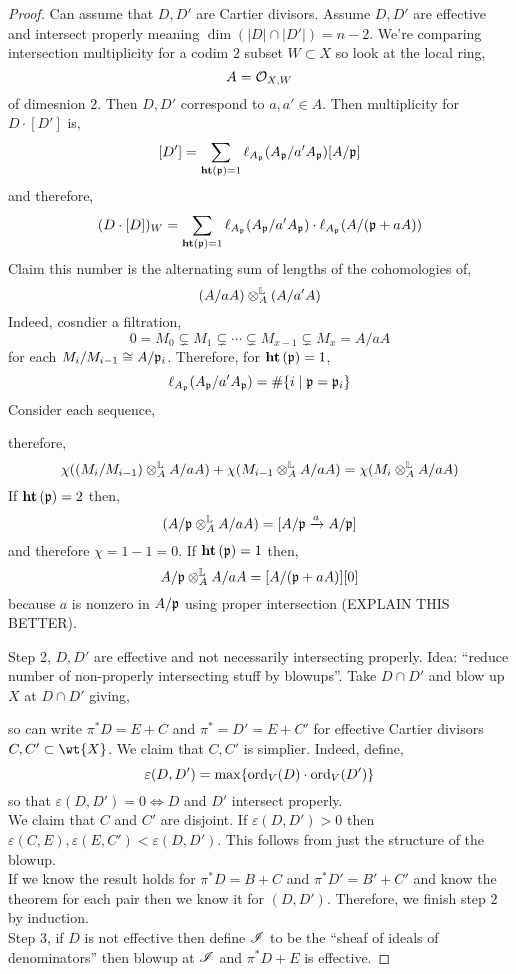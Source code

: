 \documentclass[12pt]{article}
\begin{document}
\begin{proof}
Can assume that $D, D'$ are Cartier divisors. Assume $D, D'$ are effective and intersect properly meaning $\dim{(|D| \cap |D'|)} = n-2$. We're comparing intersection multiplicity for a codim $2$ subset $W \subset X$ so look at the local ring,
\[ A = \mathcal{O}_{X, W} \]
of dimesnion $2$. Then $D, D'$ correspond to $a,a' \in A$. Then multiplicity for $D \cdot [D']$ is,
\[ [D'] = \sum_{\mathbf{ht}\left( \mathfrak{p} \right) = 1} \ell_{A_{\mathfrak{p}}}(A_{\mathfrak{p}} / a' A_{\mathfrak{p}}) [A/\mathfrak{p}] \]
and therefore,
\[ (D \cdot [D])_W = \sum_{\mathbf{ht}\left( \mathfrak{p} \right) = 1} \ell_{A_{\mathfrak{p}}}(A_{\mathfrak{p}} / a' A_{\mathfrak{p}}) \cdot \ell_{A_{\mathfrak{p}}}(A / (\mathfrak{p} + a A)) \]
Claim this number is the alternating sum of lengths of the cohomologies of,
\[ (A / a A) \otimes^{\mathbb{L}}_A (A / a' A) \]
Indeed, cosndier a filtration,
\[ 0 = M_0 \subsetneq M_1 \subsetneq \cdots \subsetneq M_{x-1} \subsetneq M_x = A / a A \]
for each $M_i / M_{i-1} \cong A / \mathfrak{p}_i$. Therefore, for $\mathbf{ht}\left( \mathfrak{p} \right) = 1$,
\[ \ell_{A_{\mathfrak{p}}}(A_{\mathfrak{p}} / a' A_{\mathfrak{p}}) = \# \{ i \mid \mathfrak{p} = \mathfrak{p}_i \} \]
Consider each sequence,
\begin{center}
\end{center}
therefore,
\[ \chi((M_i / M_{i-1}) \otimes_A^{\mathbb{L}} A / a A) + \chi(M_{i-1} \otimes_A^{\mathbb{L}} A / a A) = \chi(M_i \otimes_A^{\mathbb{L}} A / a A) \]
If $\mathbf{ht}\left( \mathfrak{p} \right) = 2$ then,
\[ (A / \mathfrak{p} \otimes_A^{\mathbb{L}} A / a A) = [ A / \mathfrak{p} \xrightarrow{a} A / \mathfrak{p}] \]
and therefore $\chi = 1 - 1 = 0$. If $\mathbf{ht}\left( \mathfrak{p} \right) = 1$ then,
\[ A / \mathfrak{p} \otimes^{\mathbb{L}}_A A / a A = [A / (\mathfrak{p} + a A)][0] \] 
because $a$ is nonzero in $A / \mathfrak{p}$ using proper intersection (EXPLAIN THIS BETTER). 

Step 2, $D, D'$ are effective and not necessarily intersecting properly. Idea: ``reduce number of non-properly intersecting stuff by blowups''. Take $D \cap D'$ and blow up $X$ at $D \cap D'$ giving,
\begin{center}
\end{center}
so can write $\pi^* D = E + C$ and $\pi^* = D' = E + C'$ for effective Cartier divisors $C, C' \subset \wt{X}$. We claim that $C, C'$ is simplier. Indeed, define,
\[ \varepsilon(D, D') = \max \{ \operatorname{\mathrm{ord}}_V(D) \cdot \operatorname{\mathrm{ord}}_V(D') \} \]
so that $\varepsilon(D, D') = 0 \iff D$ and $D'$ intersect properly.
\bigskip\\
We claim that $C$ and $C'$ are disjoint. If $\varepsilon(D, D') > 0$ then $\varepsilon(C, E), \varepsilon(E, C') < \varepsilon(D, D')$. This follows from just the structure of the blowup. 
\bigskip\\
If we know the result holds for $\pi^* D = B + C$ and $\pi^* D' = B' + C'$ and know the theorem for each pair then we know it for $(D, D')$. Therefore, we finish step $2$ by induction. 
\bigskip\\
Step 3, if $D$ is not effective then define $\mathscr{I}$ to be the ``sheaf of ideals of denominators'' then blowup at $\mathscr{I}$ and $\pi^* D + E$ is effective. 
\end{proof}
\end{document}
